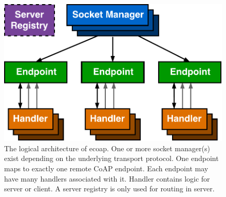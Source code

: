 \begin{figure}[!htbp]
\centering
\includegraphics[scale = 0.55]{ecoap_logic_arch}
\caption[The logical architecture of ecoap]{The logical architecture of ecoap. One or more socket manager(s) exist depending on the underlying transport protocol. One endpoint maps to exactly one remote CoAP endpoint. Each endpoint may have many handlers associated with it. Handler contains logic for server or client. A server registry is only used for routing in server.}
\label{fig:ecoap_arch_logic}
\end{figure}

